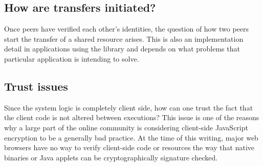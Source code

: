 \subsection{How are transfers initiated?}
Once peers have verified each other’s identities, the question of how two peers start the transfer of a shared resource arises. This is also an implementation detail in applications using the library and depends on what problems that particular application is intending to solve.

\subsection{Trust issues}
Since the system logic is completely client side, how can one trust the fact that the client code is not altered between executions? This issue is one of the reasons why a large part of the online community is considering client-side JavaScript encryption to be a generally bad practice. At the time of this writing, major web browsers have no way to verify client-side code or resources the way that native binaries or Java applets can be cryptographically signature checked.
